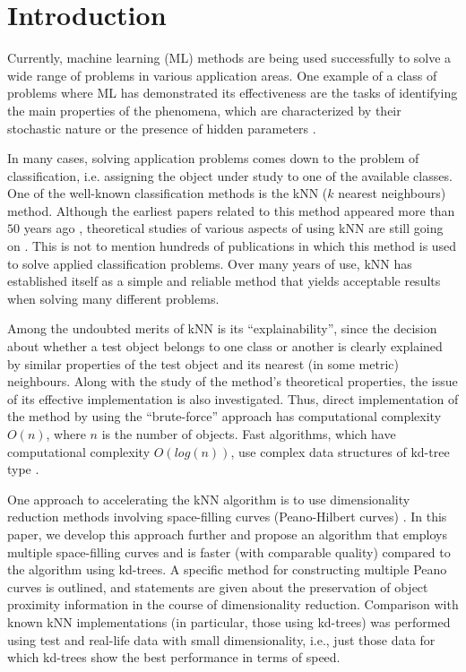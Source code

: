 \documentclass[entropy,article,submit,moreauthors,pdftex]{Definitions/mdpi}
\begin{document}

\section{Introduction}

Currently, machine learning (ML) methods are being used successfully to solve a wide range of problems in various application areas. One example of a class of problems where ML has demonstrated its effectiveness are the tasks of identifying the main properties of the phenomena, which are characterized by their stochastic nature or the presence of hidden parameters \cite{Golovenkin2020,Gonoskov2019,Kastalskiy2021}. 

In many cases, solving application problems comes down to the problem of classification, i.e. assigning the object under study to one of the available classes. One of the well-known classification methods is the kNN ($k$ nearest neighbours) method. Although the earliest papers related to this method appeared more than $50$ years ago \cite{Cover1967, Cover1968}, theoretical studies of various aspects of using kNN are still going on \cite{Pestov2013,Mirkes2020}. This is not to mention hundreds of publications in which this method is used to solve applied classification problems. Over many years of use, kNN has established itself as a simple and reliable method that yields acceptable results when solving many different problems. 

Among the undoubted merits of kNN is its ``explainability'', since the decision about whether a test object belongs to one class or another is clearly explained by similar properties of the test object and its nearest (in some metric) neighbours.
Along with the study of the method's theoretical properties, the issue of its effective implementation is also investigated. Thus, direct implementation of the method by using the  ``brute-force'' approach has computational complexity $O(n)$, where $n$ is the number of objects. Fast algorithms, which have computational complexity $O(log(n))$, use complex data structures of kd-tree type \cite{Bentley1975MultidimensionalBS}.

One approach to accelerating the kNN algorithm is to use dimensionality reduction methods involving space-filling curves (Peano-Hilbert curves) \cite{Liao2001, Schubert2015FastAS}. In this paper, we develop this approach further and propose an algorithm that employs multiple space-filling curves and is faster (with comparable quality) compared to the algorithm using kd-trees. A specific method for constructing multiple Peano curves is outlined, and statements are given about the preservation of object proximity information in the course of dimensionality reduction. Comparison with known kNN implementations (in particular, those using kd-trees) was performed using test and real-life data with small dimensionality, i.e., just those data for which kd-trees show the best performance in terms of speed.
\end{document}
